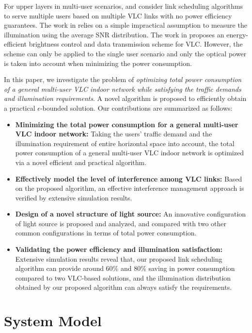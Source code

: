 \documentclass[10pt,journal]{IEEEtran}
\begin{document}
For upper layers in multi-user scenarios, \cite{li2012vico} and \cite{tao2015scheduling} consider link scheduling algorithms to serve multiple users based on multiple VLC links with no power efficiency guarantees. The work in \cite{li2012vico} relies on a simple impractical assumption to measure the illumination using the average SNR distribution. The work in \cite{din2014energy} proposes an energy-efficient brightness control and data transmission scheme for VLC. However, the scheme can only be applied to the single user scenario and only the optical power is taken into account when minimizing the power consumption.

In this paper, we investigate the problem of {\it optimizing total power consumption of a general multi-user VLC indoor network while satisfying the traffic demands and illumination requirements}. A novel algorithm is proposed to efficiently obtain a practical $\epsilon$-bounded solution. Our contributions are summarized as follows:



\begin{itemize}
\item {\bf Minimizing the total power consumption for a general multi-user VLC indoor network:} Taking the users' traffic demand and the illumination requirement of entire horizontal space into account, the total power consumption of a general multi-user VLC indoor network is optimized via a novel efficient and practical algorithm.
\item {\bf Effectively model the level of interference among VLC links:} Based on the proposed algorithm, an effective interference management approach is verified by extensive simulation results.
\item {\bf Design of a novel structure of light source:} An innovative configuration of light source is proposed and analyzed, and compared with two other common configurations in terms of total power consumption.
\item {\bf Validating the power efficiency and illumination satisfaction:} Extensive simulation results reveal that, our proposed link scheduling algorithm can provide around 60\% and 80\% saving in power consumption compared to two VLC-based solutions, and the illumination distribution obtained by our proposed algorithm can always satisfy the requirements.
\end{itemize}


\section{System Model}\label{system_model}
\end{document}
